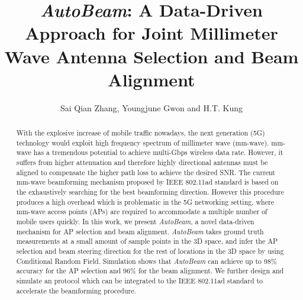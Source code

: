 \documentclass[conference]{IEEEtran}
\begin{document}
\title{\emph{AutoBeam}: A Data-Driven Approach for Joint Millimeter Wave Antenna Selection and Beam Alignment}


\author{Sai Qian Zhang, Youngjune Gwon and H.T. Kung\\
}


\maketitle
\begin{abstract}
	
With the explosive increase of mobile traffic nowadays, the next generation (5G) technology would exploit high frequency spectrum of millimeter wave (mm-wave). mm-wave has a tremendous potential to achieve multi-Gbps wireless data rate. However, it suffers from higher attenuation and therefore highly directional antennas must be aligned to compensate the higher path loss to achieve the desired SNR. The current mm-wave beamforming mechanism proposed by IEEE 802.11ad standard is based on the exhaustively searching for the best beamforming direction. However this procedure produces a high overhead which is problematic in the 5G networking setting, where mm-wave access points (APs) are required to accommodate a multiple number of mobile users quickly. In this work, we present \emph{AutoBeam}, a novel data-driven mechanism for AP selection and beam alignment. \emph{AutoBeam} takes ground truth measurements at a small amount of sample points in the 3D space, and infer the AP selection and beam steering direction for the rest of locations in the 3D space by using Conditional Random Field. Simulation shows that \emph{AutoBeam} can achieve up to $98\%$ accuracy for the AP selection and $96\%$ for the beam alignment. We further design and simulate an protocol which can be integrated to the IEEE 802.11ad standard to accelerate the beamforming procedure. 

\end{abstract}
\end{document}
